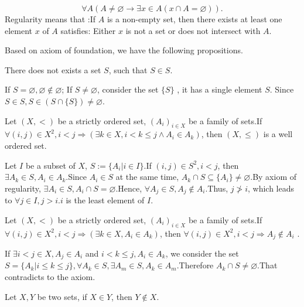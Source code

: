 \documentclass{book}
\numberwithin{equation}{section}
\begin{document}
\begin{axiomenv}
    $$\forall A(A\not=\varnothing\rightarrow\exists x\in A(x\cap A=\varnothing)).$$
    Regularity means that :If $A$ is a non-empty set, then there exists at least one element $x$ of $A$ satisfies: Either $x$ is not a set or does not intersect with $A$.
\end{axiomenv}
Based on axiom of foundation, we have the following propositions.
\begin{propositionenv}
    
    There does not exists a set $S$,  such that $S\in S$.
\end{propositionenv}
\begin{proofenv}
    If $S=\varnothing, \varnothing\notin\varnothing$; If $S\not=\varnothing$, consider the set $\{S\}$ , it has a single element $S$. Since $S\in S, S\in (S\cap\{S\})\not=\varnothing$.
\end{proofenv}
\begin{propositionenv}

    Let $(X, <)$ be a strictly ordered set,  $(A_i)_{i\in X}$ be a family of sets.If $\forall (i, j)\in X^2, i<j\Rightarrow(\exists k\in X, i<k\le j\wedge A_i\in A_k)$,  then $(X, \le)$ is a well ordered set.
\end{propositionenv}
\begin{proofenv}
    
    Let $I$ be a subset of $X$,  $S:=\{A_i|i\in I\}$.If $(i, j)\in S^2, i<j$,  then $\exists A_k\in S, A_i\in A_k$.Since $A_i\in S$ at the same time,  $A_k\cap S\subseteq\{A_i\}\not=\varnothing$.By axiom of regularity, $\exists A_i\in S, A_i\cap S=\varnothing$.Hence, $\forall A_j\in S, A_j\notin A_i$.Thus, $j\not>i$, which leads to $\forall j\in I,  j>i$.$i$ is the least element of $I$.
\end{proofenv}
\begin{propositionenv}
   Let $(X, <)$ be a strictly ordered set,  $(A_i)_{i\in X}$ be a family of sets.If $\forall (i, j)\in X^2, i<j\Rightarrow(\exists k\in X,  A_i\in A_k)$,  then $\forall (i, j)\in X^2, i<j\Rightarrow A_j\notin A_i$ .
\end{propositionenv}
\begin{proofenv}
    If $\exists i<j\in X, A_j\in A_i$ and $i<k\le j, A_i\in A_k$, we consider the set $S=\{A_k|i\le k\le j\}, \forall A_k\in S, \exists A_m\in S, A_k\in A_m$.Therefore $A_k\cap S\not=\varnothing$.That contradicts to the axiom.
\end{proofenv}
\begin{corollaryenv}
    Let $X, Y$ be two sets,  if $X\in Y$,  then $Y\notin X$.
\end{corollaryenv}
\end{document}
